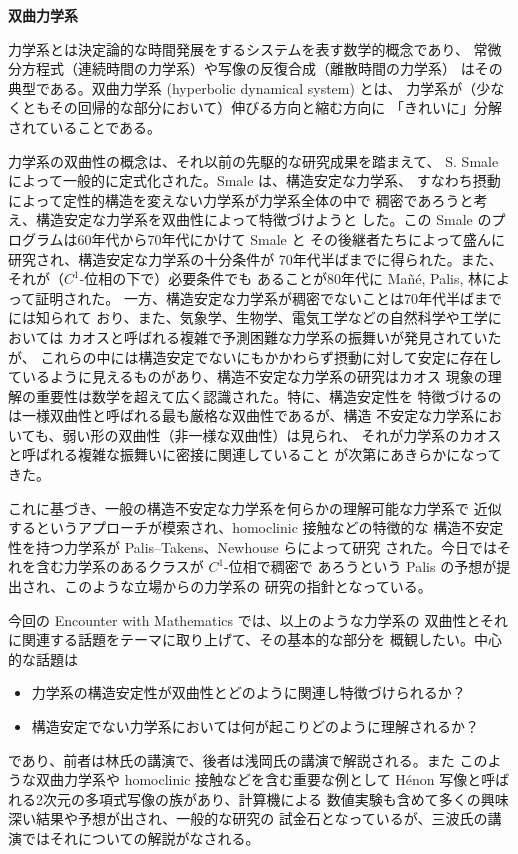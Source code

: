 \documentclass[uplatex,dvipdfmx]{jlreq}
\begin{document}
\begin{center}
{\large\bfseries 双曲力学系}\\[6pt]
\hspace*{\fill}{\large\bfseries 国府 寛司（京都大学 大学院理学研究科 数学教室）}
\end{center}
\vspace{1pc}

力学系とは決定論的な時間発展をするシステムを表す数学的概念であり、
常微分方程式（連続時間の力学系）や写像の反復合成（離散時間の力学系）
はその典型である。双曲力学系 (hyperbolic dynamical system) とは、
力学系が（少なくともその回帰的な部分において）伸びる方向と縮む方向に
「きれいに」分解されていることである。

力学系の双曲性の概念は、それ以前の先駆的な研究成果を踏まえて、
S. Smale によって一般的に定式化された。Smale は、構造安定な力学系、
すなわち摂動によって定性的構造を変えない力学系が力学系全体の中で
稠密であろうと考え、構造安定な力学系を双曲性によって特徴づけようと
した。この Smale のプログラムは60年代から70年代にかけて Smale と
その後継者たちによって盛んに研究され、構造安定な力学系の十分条件が
70年代半ばまでに得られた。また、それが（$C^1$-位相の下で）必要条件でも
あることが80年代に Mañé, Palis, 林によって証明された。
一方、構造安定な力学系が稠密でないことは70年代半ばまでには知られて
おり、また、気象学、生物学、電気工学などの自然科学や工学においては
カオスと呼ばれる複雑で予測困難な力学系の振舞いが発見されていたが、
これらの中には構造安定でないにもかかわらず摂動に対して安定に存在し
ているように見えるものがあり、構造不安定な力学系の研究はカオス
現象の理解の重要性は数学を超えて広く認識された。特に、構造安定性を
特徴づけるのは一様双曲性と呼ばれる最も厳格な双曲性であるが、構造
不安定な力学系においても、弱い形の双曲性（非一様な双曲性）は見られ、
それが力学系のカオスと呼ばれる複雑な振舞いに密接に関連していること
が次第にあきらかになってきた。

これに基づき、一般の構造不安定な力学系を何らかの理解可能な力学系で
近似するというアプローチが模索され、homoclinic 接触などの特徴的な
構造不安定性を持つ力学系が Palis--Takens、Newhouse らによって研究
された。今日ではそれを含む力学系のあるクラスが $C^1$-位相で稠密で
あろうという Palis の予想が提出され、このような立場からの力学系の
研究の指針となっている。

今回の Encounter with Mathematics では、以上のような力学系の
双曲性とそれに関連する話題をテーマに取り上げて、その基本的な部分を
概観したい。中心的な話題は
\begin{itemize}
\item 力学系の構造安定性が双曲性とどのように関連し特徴づけられるか？
\item 構造安定でない力学系においては何が起こりどのように理解されるか？
\end{itemize}
であり、前者は林氏の講演で、後者は浅岡氏の講演で解説される。また
このような双曲力学系や homoclinic 接触などを含む重要な例として
Hénon 写像と呼ばれる2次元の多項式写像の族があり、計算機による
数値実験も含めて多くの興味深い結果や予想が出され、一般的な研究の
試金石となっているが、三波氏の講演ではそれについての解説がなされる。
\end{document}
